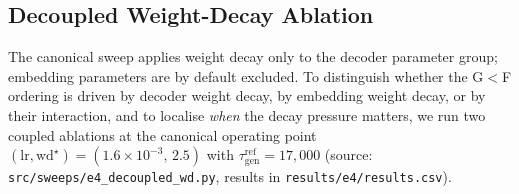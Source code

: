 \documentclass{article}
\newcommand{\taug}{\tau_{\mathrm{gen}}}
\begin{document}
\subsection{Decoupled Weight-Decay Ablation}
\label{sec:e4_ablation}

The canonical sweep applies weight decay only to the decoder
parameter group; embedding parameters are by default excluded.
To distinguish whether the G$<$F ordering is driven by decoder
weight decay, by embedding weight decay, or by their interaction,
and to localise \emph{when} the decay pressure matters, we run two
coupled ablations at the canonical operating point
$(\mathrm{lr},\mathrm{wd}^{\star}){=}(1.6{\times}10^{-3},\,2.5)$
with $\taug^{\mathrm{ref}}{=}17{,}000$
(source: \texttt{src/sweeps/e4\_decoupled\_wd.py},
results in \texttt{results/e4/results.csv}).
\end{document}
